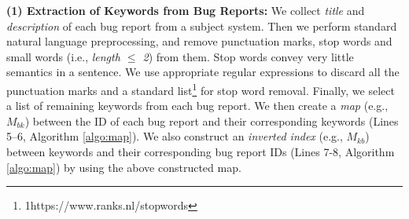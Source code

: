 \documentclass[sigconf,review,anonymous]{acmart}
\begin{document}
\textbf{(1) Extraction of Keywords from Bug Reports:} We collect \emph{title} and \emph{description} of each bug report from a subject system.  
Then we perform standard natural language preprocessing, and remove punctuation marks, stop words and small words (i.e., \emph{length $\le$ 2}) from them. Stop words convey very little semantics in a sentence. 
We use appropriate regular expressions to discard all the punctuation marks and 
a standard list\footnote{{1}https://www.ranks.nl/stopwords} for stop word removal. 
Finally, we select a list of remaining keywords from each bug report. 
We then create a \emph{map} (e.g., $M_{bk}$) between the ID of each bug report and their corresponding keywords (Lines 5--6, Algorithm \ref{algo:map}).   
We also construct an \emph{inverted index} (e.g., $M_{kb}$) between keywords and their corresponding bug report IDs (Lines 7-8, Algorithm \ref{algo:map}) by using the above constructed map.
\end{document}
